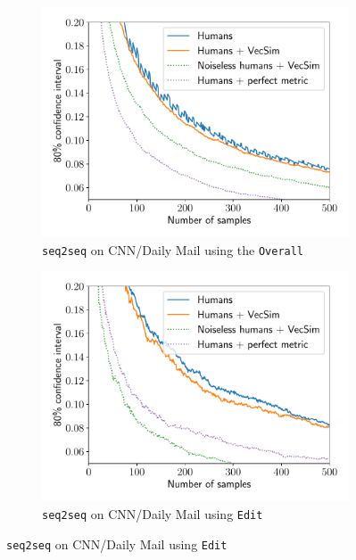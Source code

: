 \begin{figure}[!p]
  \centering
  \begin{subfigure}[t]{0.45\textwidth}
  \includegraphics[width=\textwidth]{figures/lqual_trajectory_foil}
    \caption{\label{fig:price:trajectory-a}\texttt{seq2seq} on CNN/Daily Mail using the \texttt{Overall}}
  \end{subfigure} 
  \hfill
  \begin{subfigure}[t]{0.45\textwidth}
  \includegraphics[width=\textwidth]{figures/lqual_trajectory}
  \caption{\label{fig:price:trajectory-b}\texttt{seq2seq} on CNN/Daily Mail using \texttt{Edit} }
  \end{subfigure}


\end{figure}
